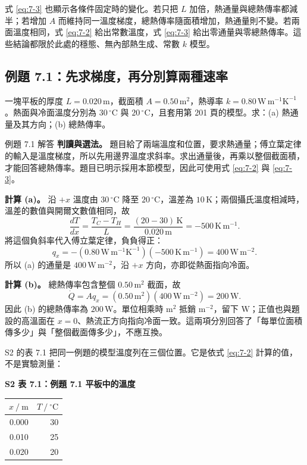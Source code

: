 式 \eqref{eq:7-3} 也顯示各條件固定時的變化。若只把 \(L\) 加倍，熱通量與總熱傳率都減半；若增加 \(A\) 而維持同一溫度梯度，總熱傳率隨面積增加，熱通量則不變。若兩面溫度相同，式 \eqref{eq:7-2} 給出常數溫度，式 \eqref{eq:7-3} 給出零通量與零總熱傳率。這些結論都限於此處的穩態、無內部熱生成、常數 \(k\) 模型。

\subsection{例題 7.1：先求梯度，再分別算兩種速率}

一塊平板的厚度 \(L=0.020\,\mathrm m\)，截面積 \(A=0.50\,\mathrm{m^2}\)，熱導率 \(k=0.80\,\mathrm{W\,m^{-1}K^{-1}}\)。熱面與冷面溫度分別為 \(30\,^{\circ}\mathrm C\) 與 \(20\,^{\circ}\mathrm C\)，且套用第 201 頁的模型。求：(a) 熱通量及其方向；(b) 總熱傳率。

\begin{examplebox}{例題 7.1 解答}
\textbf{判讀與選法。} 題目給了兩端溫度和位置，要求熱通量；傅立葉定律的輸入是溫度梯度，所以先用邊界溫度求斜率。求出通量後，再乘以整個截面積，才能回答總熱傳率。題目已明示採用本節模型，因此可使用式 \eqref{eq:7-2} 與 \eqref{eq:7-3}。

\textbf{計算 (a)。} 沿 \(+x\) 溫度由 \(30\,^{\circ}\mathrm C\) 降至 \(20\,^{\circ}\mathrm C\)，溫差為 \(10\,\mathrm K\)；兩個攝氏溫度相減時，溫差的數值與開爾文數值相同，故
\[
\frac{dT}{dx}=\frac{T_C-T_H}{L}
=\frac{(20-30)\,\mathrm K}{0.020\,\mathrm m}
=-500\,\mathrm{K\,m^{-1}}.
\]
將這個負斜率代入傅立葉定律，負負得正：
\[
q_x=-(0.80\,\mathrm{W\,m^{-1}K^{-1}})
(-500\,\mathrm{K\,m^{-1}})
=400\,\mathrm{W\,m^{-2}}.
\]
所以 (a) 的通量是 \(400\,\mathrm{W\,m^{-2}}\)，沿 \(+x\) 方向，亦即從熱面指向冷面。

\textbf{計算 (b)。} 總熱傳率包含整個 \(0.50\,\mathrm{m^2}\) 截面，故
\[
\dot Q=Aq_x
=(0.50\,\mathrm{m^2})(400\,\mathrm{W\,m^{-2}})
=200\,\mathrm W.
\]
因此 (b) 的總熱傳率為 \(200\,\mathrm W\)。單位相乘時 \(\mathrm{m^2}\) 抵銷 \(\mathrm{m^{-2}}\)，留下 \(\mathrm W\)；正值也與題設的高溫面在 \(x=0\)、熱流正方向指向冷面一致。這兩項分別回答了「每單位面積傳多少」與「整個截面傳多少」，不應互換。
\end{examplebox}

S2 的表 7.1 把同一例題的模型溫度列在三個位置。它是依式 \eqref{eq:7-2} 計算的值，不是實驗測量：

\begin{center}
\textbf{S2 表 7.1：例題 7.1 平板中的溫度}
\end{center}
\begin{center}
\begin{tabular}{rr}
\toprule
\(x\ /\ \mathrm m\) & \(T\ /\ ^{\circ}\mathrm C\) \\
\midrule
0.000 & 30 \\
0.010 & 25 \\
0.020 & 20 \\
\bottomrule
\end{tabular}
\end{center}

